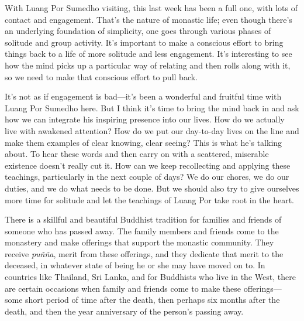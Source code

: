 
With Luang Por Sumedho visiting, this last week has been a full one, 
with lots of contact and engagement. That's the nature of monastic 
life; even though there's an underlying foundation of simplicity, one 
goes through various phases of solitude and group activity. It's 
important to make a conscious effort to bring things back to a life of 
more solitude and less engagement. It's interesting to see how the mind 
picks up a particular way of relating and then rolls along with it, so 
we need to make that conscious effort to pull back.

It's not as if engagement is bad---it's been a wonderful and fruitful 
time with Luang Por Sumedho here. But I think it's time to bring the 
mind back in and ask how we can integrate his inspiring presence into 
our lives. How do we actually live with awakened attention? How do we 
put our day-to-day lives on the line and make them examples of clear 
knowing, clear seeing? This is what he's talking about. To hear these 
words and then carry on with a scattered, miserable existence doesn't 
really cut it. How can we keep recollecting and applying these 
teachings, particularly in the next couple of days? We do our chores, 
we do our duties, and we do what needs to be done. But we should also 
try to give ourselves more time for solitude and let the teachings of 
Luang Por take root in the heart.


There is a skillful and beautiful Buddhist tradition for families and 
friends of someone who has passed away. The family members and friends 
come to the monastery and make offerings that support the monastic 
community. They receive \emph{puñña}, merit from these offerings, and 
they dedicate that merit to the deceased, in whatever state of being he 
or she may have moved on to. In countries like Thailand, Sri Lanka, and 
for Buddhists who live in the West, there are certain occasions when 
family and friends come to make these offerings---some short period of 
time after the death, then perhaps six months after the death, and then 
the year anniversary of the person's passing away.

